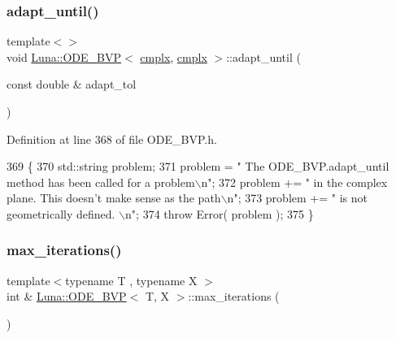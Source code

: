 \subsubsection{\texorpdfstring{adapt\+\_\+until()}{adapt\_until()}\hspace{0.1cm}{\footnotesize\ttfamily [3/3]}}
{\footnotesize\ttfamily template$<$$>$ \\
void \hyperlink{classLuna_1_1ODE__BVP}{Luna\+::\+O\+D\+E\+\_\+\+B\+VP}$<$ \hyperlink{namespaceLuna_af3257e90072a78a8ffb16a16773aa18e}{cmplx}, \hyperlink{namespaceLuna_af3257e90072a78a8ffb16a16773aa18e}{cmplx} $>$\+::adapt\+\_\+until (\begin{DoxyParamCaption}\item[{const double \&}]{adapt\+\_\+tol }\end{DoxyParamCaption})}



Definition at line 368 of file O\+D\+E\+\_\+\+B\+V\+P.\+h.


\begin{DoxyCode}
369   \{
370     std::string problem;
371     problem = \textcolor{stringliteral}{" The ODE\_BVP.adapt\_until method has been called for a problem\(\backslash\)n"};
372     problem += \textcolor{stringliteral}{" in the complex plane. This doesn't make sense as the path\(\backslash\)n"};
373     problem += \textcolor{stringliteral}{" is not geometrically defined. \(\backslash\)n"};
374     \textcolor{keywordflow}{throw} Error( problem );
375   \}
\end{DoxyCode}
\mbox{\label{classLuna_1_1ODE__BVP_ad013352e3aa277825cbac01d6334554b}} 
\subsubsection{\texorpdfstring{max\+\_\+iterations()}{max\_iterations()}}
{\footnotesize\ttfamily template$<$typename T , typename X $>$ \\
int \& \hyperlink{classLuna_1_1ODE__BVP}{Luna\+::\+O\+D\+E\+\_\+\+B\+VP}$<$ T, X $>$\+::max\+\_\+iterations (\begin{DoxyParamCaption}{ }\end{DoxyParamCaption})}



